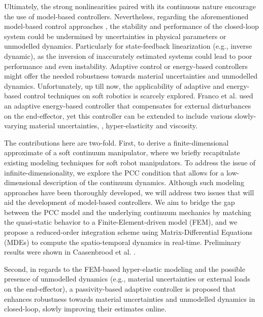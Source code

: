 Ultimately, the strong nonlinearities paired with its continuous nature encourage the use of model-based controllers. Nevertheless, regarding the aforementioned model-based control approaches \cite{DellaSantina2020,Katzschmann2019,Falkenhahn2015}, the stability and performance of the closed-loop system could be undermined by uncertainties in physical parameters or unmodelled dynamics. Particularly for state-feedback linearization (e.g., inverse dynamic), as the inversion of inaccurately estimated systems could lead to poor performance and even instability. Adaptive control \cite{Slotine1988,Morgan1977} or energy-based controllers \cite{Ortega1998} might offer the needed robustness towards material uncertainties and unmodelled dynamics. Unfortunately, up till now, the applicability of adaptive and energy-based control techniques on soft robotics is scarcely explored. Franco et al. \cite{Franco2020} used an adaptive energy-based controller that compensates for external disturbances on the end-effector, yet this controller can be extended to include various slowly-varying material uncertainties, \eg, hyper-elasticity and viscosity.


The contributions here are two-fold. First, to derive a finite-dimensional approximate of a soft continuum manipulator, where we briefly recapitulate existing modeling techniques for soft robot manipulators. To address the issue of infinite-dimensionality, we explore the PCC condition that allows for a low-dimensional description of the continuum dynamics. Although such modeling approaches have been thoroughly developed, we will address two issues that will aid the development of model-based controllers. We aim to bridge the gap between the PCC model and the underlying continuum mechanics by matching the quasi-static behavior to a Finite-Element-driven model (FEM), and we propose a reduced-order integration scheme using Matrix-Differential Equations (MDEs) to compute the spatio-temporal dynamics in real-time. Preliminary results were shown in Caasenbrood et al. \cite{Caasenbrood2020,Caasenbrood2022}.
%

Second, in regards to the FEM-based hyper-elastic modeling and the possible presence of unmodelled dynamics (e.g., material uncertainties or external loads on the end-effector), a passivity-based adaptive controller is proposed that enhances robustness towards material uncertainties and unmodelled dynamics in closed-loop, slowly improving their estimates online.

